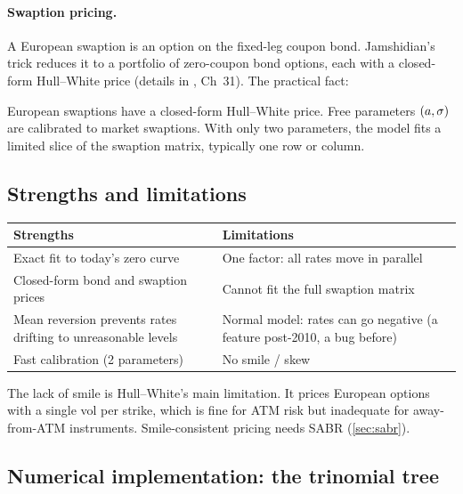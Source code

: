 \paragraph{Swaption pricing.}
A European swaption is an option on the fixed-leg coupon bond.
Jamshidian's trick reduces it to a portfolio of zero-coupon bond
options, each with a closed-form Hull--White price (details in
\citeHull, Ch~31).  The practical fact:

\begin{keyfactbox}
European swaptions have a closed-form Hull--White price.  Free
parameters $(a, \sigma)$ are calibrated to market swaptions.  With
only two parameters, the model fits a limited slice of the swaption
matrix, typically one row or column.
\end{keyfactbox}

\subsection{Strengths and limitations}

\begin{center}
\begin{tabular}{p{}p{}}
  \toprule
  \textbf{Strengths} & \textbf{Limitations} \\
  \midrule
  Exact fit to today's zero curve &
    One factor: all rates move in parallel \\[3pt]
  Closed-form bond and swaption prices &
    Cannot fit the full swaption matrix \\[3pt]
  Mean reversion prevents rates drifting to unreasonable levels &
    Normal model: rates can go negative (a feature post-2010, a bug
    before) \\[3pt]
  Fast calibration (2 parameters) &
    No smile / skew \\
  \bottomrule
\end{tabular}
\end{center}

The lack of smile is Hull--White's main limitation.  It prices
European options with a single vol per strike, which is fine for ATM
risk but inadequate for away-from-ATM instruments.  Smile-consistent
pricing needs SABR (\cref{sec:sabr}).

\subsection{Numerical implementation: the trinomial tree}

